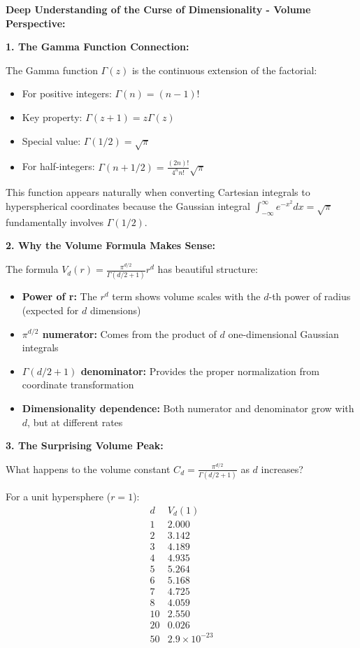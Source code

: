 \documentclass[12pt]{article}
\begin{document}
\begin{explanation}
\textbf{Deep Understanding of the Curse of Dimensionality - Volume Perspective:}

\textbf{1. The Gamma Function Connection:}

The Gamma function \(\Gamma(z)\) is the continuous extension of the factorial:
\begin{itemize}
    \item For positive integers: \(\Gamma(n) = (n-1)!\)
    \item Key property: \(\Gamma(z+1) = z\Gamma(z)\)
    \item Special value: \(\Gamma(1/2) = \sqrt{\pi}\)
    \item For half-integers: \(\Gamma(n + 1/2) = \frac{(2n)!}{4^n n!}\sqrt{\pi}\)
\end{itemize}

This function appears naturally when converting Cartesian integrals to hyperspherical coordinates because the Gaussian integral \(\int_{-\infty}^{\infty} e^{-x^2} dx = \sqrt{\pi}\) fundamentally involves \(\Gamma(1/2)\).

\textbf{2. Why the Volume Formula Makes Sense:}

The formula \(V_d(r) = \frac{\pi^{d/2}}{\Gamma(d/2 + 1)} r^d\) has beautiful structure:

\begin{itemize}
    \item \textbf{Power of r:} The \(r^d\) term shows volume scales with the \(d\)-th power of radius (expected for \(d\) dimensions)
    \item \textbf{\(\pi^{d/2}\) numerator:} Comes from the product of \(d\) one-dimensional Gaussian integrals
    \item \textbf{\(\Gamma(d/2+1)\) denominator:} Provides the proper normalization from coordinate transformation
    \item \textbf{Dimensionality dependence:} Both numerator and denominator grow with \(d\), but at different rates
\end{itemize}

\textbf{3. The Surprising Volume Peak:}

What happens to the volume constant \(C_d = \frac{\pi^{d/2}}{\Gamma(d/2 + 1)}\) as \(d\) increases?

For a unit hypersphere (\(r=1\)):
\[
\begin{array}{c|c}
d & V_d(1) \\
\hline
1 & 2.000 \\
2 & 3.142 \\
3 & 4.189 \\
4 & 4.935 \\
5 & 5.264 \\
6 & 5.168 \\
7 & 4.725 \\
8 & 4.059 \\
10 & 2.550 \\
20 & 0.026 \\
50 & 2.9 \times 10^{-23} \\
\end{array}
\]


\end{explanation}
\end{document}
